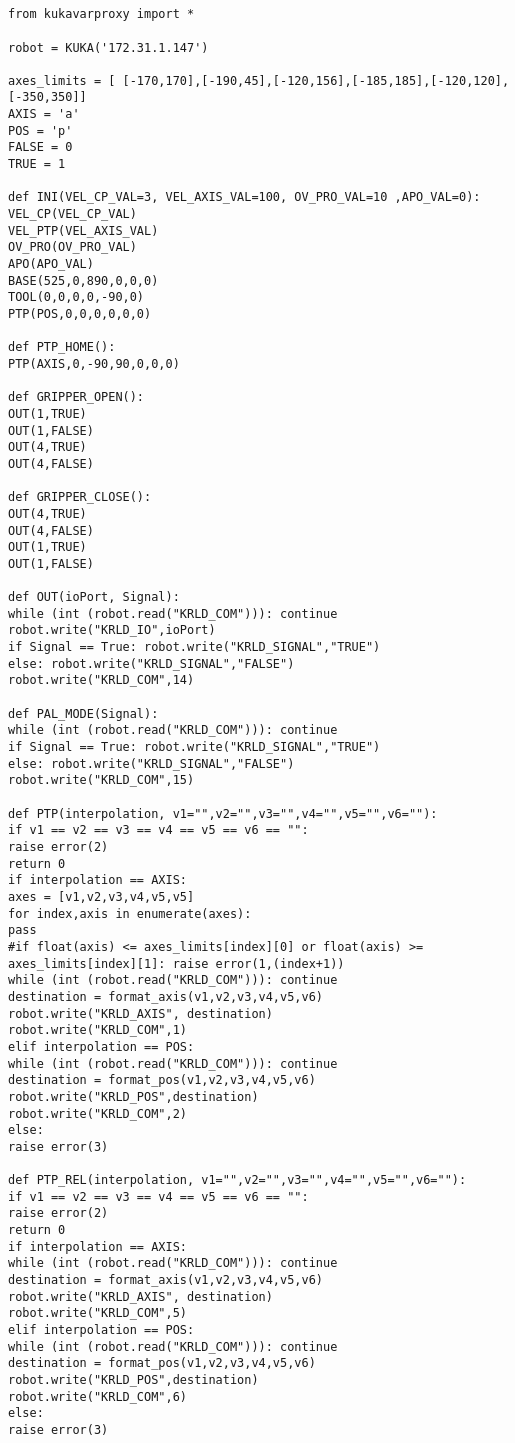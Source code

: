 \section{}
\begin{lstlisting}[language=terCmd]
from kukavarproxy import *

robot = KUKA('172.31.1.147')

axes_limits = [ [-170,170],[-190,45],[-120,156],[-185,185],[-120,120],[-350,350]]
AXIS = 'a'
POS = 'p'
FALSE = 0
TRUE = 1

def INI(VEL_CP_VAL=3, VEL_AXIS_VAL=100, OV_PRO_VAL=10 ,APO_VAL=0):
VEL_CP(VEL_CP_VAL)
VEL_PTP(VEL_AXIS_VAL)
OV_PRO(OV_PRO_VAL)
APO(APO_VAL)
BASE(525,0,890,0,0,0)
TOOL(0,0,0,0,-90,0) 
PTP(POS,0,0,0,0,0,0)

def PTP_HOME():
PTP(AXIS,0,-90,90,0,0,0)

def GRIPPER_OPEN():
OUT(1,TRUE)
OUT(1,FALSE)
OUT(4,TRUE)
OUT(4,FALSE)

def GRIPPER_CLOSE():
OUT(4,TRUE)
OUT(4,FALSE)
OUT(1,TRUE)
OUT(1,FALSE)

def OUT(ioPort, Signal):
while (int (robot.read("KRLD_COM"))): continue
robot.write("KRLD_IO",ioPort)
if Signal == True: robot.write("KRLD_SIGNAL","TRUE")
else: robot.write("KRLD_SIGNAL","FALSE")
robot.write("KRLD_COM",14)

def PAL_MODE(Signal):
while (int (robot.read("KRLD_COM"))): continue
if Signal == True: robot.write("KRLD_SIGNAL","TRUE")
else: robot.write("KRLD_SIGNAL","FALSE")
robot.write("KRLD_COM",15)

def PTP(interpolation, v1="",v2="",v3="",v4="",v5="",v6=""):
if v1 == v2 == v3 == v4 == v5 == v6 == "": 
raise error(2)
return 0
if interpolation == AXIS: 
axes = [v1,v2,v3,v4,v5,v5]
for index,axis in enumerate(axes):
pass
#if float(axis) <= axes_limits[index][0] or float(axis) >= axes_limits[index][1]: raise error(1,(index+1))
while (int (robot.read("KRLD_COM"))): continue
destination = format_axis(v1,v2,v3,v4,v5,v6)
robot.write("KRLD_AXIS", destination)
robot.write("KRLD_COM",1)
elif interpolation == POS:
while (int (robot.read("KRLD_COM"))): continue
destination = format_pos(v1,v2,v3,v4,v5,v6)
robot.write("KRLD_POS",destination)
robot.write("KRLD_COM",2)
else:
raise error(3)

def PTP_REL(interpolation, v1="",v2="",v3="",v4="",v5="",v6=""):
if v1 == v2 == v3 == v4 == v5 == v6 == "": 
raise error(2)
return 0
if interpolation == AXIS: 
while (int (robot.read("KRLD_COM"))): continue
destination = format_axis(v1,v2,v3,v4,v5,v6)
robot.write("KRLD_AXIS", destination)
robot.write("KRLD_COM",5)
elif interpolation == POS:
while (int (robot.read("KRLD_COM"))): continue
destination = format_pos(v1,v2,v3,v4,v5,v6)
robot.write("KRLD_POS",destination)
robot.write("KRLD_COM",6)
else:
raise error(3)


\end{lstlisting}
